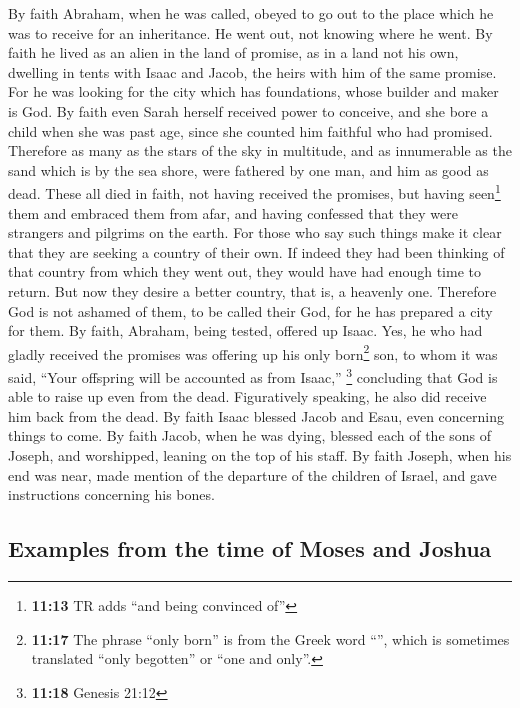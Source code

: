  By faith Abraham, when he was called, obeyed to go out to
the place which he was to receive for an inheritance. He went out, not
knowing where he went.  By faith he lived as an alien in
the land of promise, as in a land not his own, dwelling in tents with
Isaac and Jacob, the heirs with him of the same promise. 
For he was looking for the city which has foundations, whose builder and
maker is God.  By faith even Sarah herself received power
to conceive, and she bore a child when she was past age, since she
counted him faithful who had promised.  Therefore as many
as the stars of the sky in multitude, and as innumerable as the sand
which is by the sea shore, were fathered by one man, and him as good as
dead.  These all died in faith, not having received the
promises, but having seen\footnote{\textbf{11:13} TR adds ``and being
  convinced of''} them and embraced them from afar, and having confessed
that they were strangers and pilgrims on the earth.  For
those who say such things make it clear that they are seeking a country
of their own.  If indeed they had been thinking of that
country from which they went out, they would have had enough time to
return.  But now they desire a better country, that is, a
heavenly one. Therefore God is not ashamed of them, to be called their
God, for he has prepared a city for them.  By faith,
Abraham, being tested, offered up Isaac. Yes, he who had gladly received
the promises was offering up his only born\footnote{\textbf{11:17} The
  phrase ``only born'' is from the Greek word ``'',
  which is sometimes translated ``only begotten'' or ``one and only''.}
son,  to whom it was said, ``Your offspring will be
accounted as from Isaac,'' \footnote{\textbf{11:18} Genesis 21:12}
 concluding that God is able to raise up even from the
dead. Figuratively speaking, he also did receive him back from the dead.
 By faith Isaac blessed Jacob and Esau, even concerning
things to come.  By faith Jacob, when he was dying,
blessed each of the sons of Joseph, and worshipped, leaning on the top
of his staff.  By faith Joseph, when his end was near,
made mention of the departure of the children of Israel, and gave
instructions concerning his bones.

\hypertarget{examples-from-the-time-of-moses-and-joshua}{%
\subsection{Examples from the time of Moses and
Joshua}\label{examples-from-the-time-of-moses-and-joshua}}

